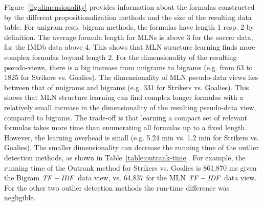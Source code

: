	Figure~\ref{fig:dimensionality} provides information about the formulas constructed by the different propositionalization methods and the size of the resulting data table. For unigram resp. bigram methods, the formulas have length 1 resp. 2 by definition. The average formula length for MLNs is above 3 for the soccer data, for the IMDb data above 4. This shows that MLN structure learning finds more complex formulas beyond length 2. For the dimensionality of the resulting pseudo-\iid views, there is a big increase from unigrams to bigrams (e.g. from 63 to 1825 for Strikers vs. Goalies). The dimensionality of MLN pseudo-\iid data views lies between that of  unigrams and bigrams (e.g. 331 for Strikers vs. Goalies). This shows that MLN structure learning can find complex longer formulas with a relatively small increase in the dimensionality of the resulting pseudo-\iid data view, compared to bigrams. The trade-off is that learning a compact set of relevant formulas takes more time than enumerating all formulas up to a fixed length. However, the learning overhead is small (e.g. 5.24 min vs. 1.2  min for Strikers vs. Goalies). The smaller dimensionality can decrease the running time of the outlier detection methods, as shown in Table~\ref{table:outrank-time}. For example, the running time of the Outrank method for Strikers vs. Goalies is 861,870 ms given the Bigram $\it{TF-IDF}$ data view, vs. 64,837 for the MLN $\it{TF-IDF}$ data view. For the other two outlier detection methods the run-time difference was negligible.
%		
